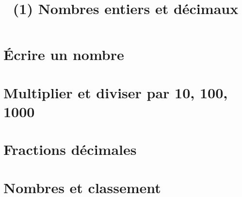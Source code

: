 \documentclass[12pt,a4paper]{article}
\date{}
\title{(1) Nombres entiers et décimaux}
\begin{document}
\maketitle





\section{\'Ecrire un nombre}\label{sec:ecrire-un-nombre}



\newpage

\section{Multiplier et diviser par 10, 100, 1000}


%
%
\section{Fractions décimales}
%

%
\section{Nombres et classement}
%

\end{document}
